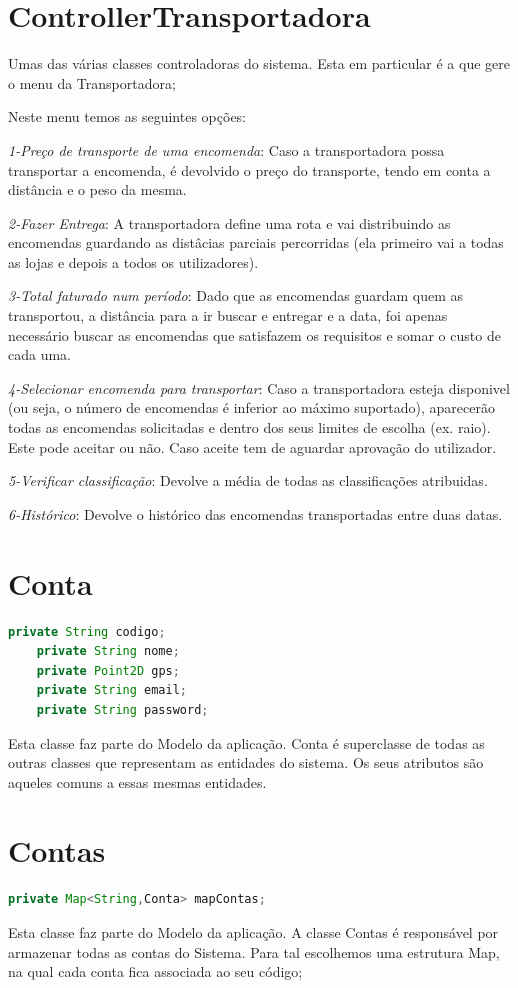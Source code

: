 \documentclass[a4paper]{report}
\begin{document}
	\section{ControllerTransportadora}
	 Umas das várias classes controladoras do sistema. Esta em particular é a que gere o menu da Transportadora;
	 
	 Neste menu temos as seguintes opções:
	 
	 \textit{1-Preço de transporte de uma encomenda}: Caso a transportadora possa transportar a encomenda, é devolvido o preço do transporte, tendo em conta a distância e o peso da mesma.
	 
	  \textit{2-Fazer Entrega}: A transportadora define uma rota e vai distribuindo as encomendas guardando as distâcias parciais percorridas (ela primeiro vai a todas as lojas e depois a todos os utilizadores).
	  
	  \textit{3-Total faturado num período}: Dado que as encomendas guardam quem as transportou, a distância para a ir buscar e entregar e a data, foi apenas necessário buscar as encomendas que satisfazem os requisitos e somar o custo de cada uma.
	 
	 \textit{4-Selecionar encomenda para transportar}: Caso a transportadora esteja disponivel (ou seja, o número de encomendas é inferior ao máximo suportado), aparecerão todas as encomendas solicitadas e dentro dos seus limites de escolha (ex. raio). Este pode aceitar ou não. Caso aceite tem de aguardar aprovação do utilizador.
	 
	\textit{5-Verificar classificação}: Devolve a média de todas as classificações atribuidas.
	 
	 \textit{6-Histórico}: Devolve o histórico das encomendas transportadas entre duas datas.
	
	\section{Conta}
	\begin{lstlisting}[language=Java]
	private String codigo;
	private String nome;
	private Point2D gps;
	private String email;
	private String password;
	\end{lstlisting}
	Esta classe faz parte do Modelo da aplicação. Conta é superclasse de todas as outras classes que representam as entidades do sistema. Os seus atributos são aqueles comuns a essas mesmas entidades.
	
	\section{Contas}
	\begin{lstlisting}[language=Java]
	private Map<String,Conta> mapContas;
	\end{lstlisting}
	Esta classe faz parte do Modelo da aplicação. A classe Contas é responsável por armazenar todas as contas do Sistema. Para tal escolhemos uma estrutura Map, na qual cada conta fica associada ao seu código;
	
\end{document}
